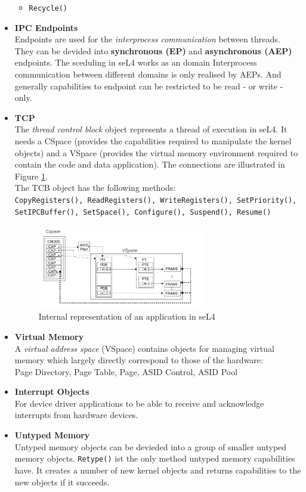 \documentclass[pdftex,11pt,a4paper]{article}
\begin{document}
\begin{itemize}
\begin{itemize}
\item \texttt{Recycle()}
\end{itemize}
	\item \textbf{IPC Endpoints} \\
	Endpoints are used for the \textit{interprocess communication} between threads. They can be devided into \textbf{synchronous (EP)} and \textbf{asynchronous (AEP)} endpoints. 
	The sceduling in seL4 works as an domain %
	Interprocess communication between different domains is only realised by AEPs. And generally capabilities to endpoint can be restricted to be read - or write - only. 
	\item \textbf{TCP} \\
	The \textit{thread control block} object represents a thread of execution in seL4. It needs a CSpace (provides the capabilities required to manipulate the kernel objects) and a VSpace (provides the virtual memory environment required to contain the code and data application). The connections are illustrated in Figure \ref{fig:intapp}. \\
	The TCB object has the following methods: \\
	\texttt{CopyRegisters(), ReadRegisters(), WriteRegisters(), SetPriority(), SetIPCBuffer(), SetSpace(), Configure(), Suspend(), Resume()}
	
	\begin{figure}[ht]
	\centering
		\includegraphics[width=0.7\textwidth]{./Pictures/applicationIntern.png}
	\caption[Internal repersentation of application]{Internal representation of an application in seL4 \cite{sel4}}
	\label{fig:intapp}
	\end{figure}
	
	\item \textbf{Virtual Memory}\\
	A \textit{virtual address space} (VSpace) contains objects for managing virtual memory which largely directly correspond to those of the hardware: \\
	Page Directory, Page Table, Page, ASID Control, ASID Pool
	\item \textbf{Interrupt Objects} \\
	For device driver applications to be able to receive and acknowledge interrupts from hardware devices.
	\item \textbf{Untyped Memory} \\
	Untyped memory objects can be devieded into a group of smaller untyped memory objects. \texttt{Retype()} ist the only method untyped memory capabilities have. It creates a number of new kernel objects and returns capabilities to the new objects if it succeeds. 
	\end{itemize}
\end{document}
